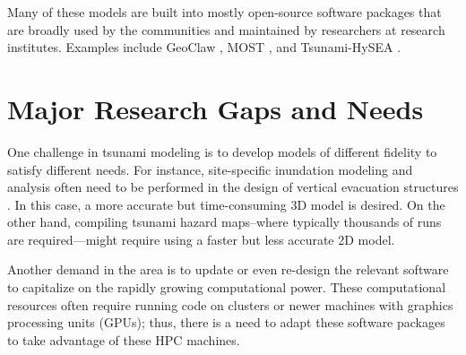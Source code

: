 Many of these models are built into mostly open-source software packages that are broadly used by the communities and maintained by researchers at research institutes. Examples include GeoClaw \citep{berger2011geoclaw}, MOST \citep{titov1997implementation}, and Tsunami-HySEA \citep{macias2016comparison}.

\section{Major Research Gaps and Needs}
\label{sec:tsunami_gaps}

One challenge in tsunami modeling is to develop models of different fidelity to satisfy different needs. For instance, site-specific inundation modeling and analysis often need to be performed in the design of vertical evacuation structures \citep{Ash, 2015, gonzalez2013tsunami}. In this case, a more accurate but time-consuming 3D model is desired. On the other hand, compiling tsunami hazard maps--where typically thousands of runs are required—might require using a faster but less accurate 2D model.

Another demand in the area is to update or even re-design the relevant software to capitalize on the rapidly growing computational power. These computational resources often require running code on clusters or newer machines with graphics processing units (GPUs); thus, there is a need to adapt these software packages to take advantage of these HPC machines.

%
